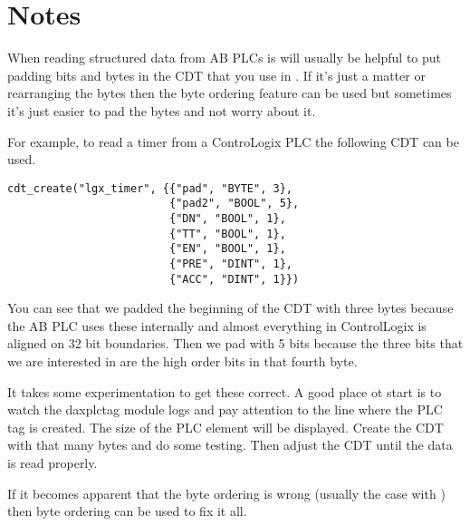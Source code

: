 \section{Notes}

When reading structured data from AB PLCs is will usually be helpful to
put padding bits and bytes in the CDT that you use in \opendax{}.  If it's
just a matter or rearranging the bytes then the byte ordering feature can
be used but sometimes it's just easier to pad the bytes and not worry about
it.

For example, to read a timer from a ControLogix PLC the following CDT can 
be used.

\begin{verbatim}
cdt_create("lgx_timer", {{"pad", "BYTE", 3},
                         {"pad2", "BOOL", 5},
                         {"DN", "BOOL", 1},
                         {"TT", "BOOL", 1},
                         {"EN", "BOOL", 1},
                         {"PRE", "DINT", 1},
                         {"ACC", "DINT", 1}})
\end{verbatim}

You can see that we padded the beginning of the CDT with three bytes because
the AB PLC uses these internally and almost everything in ControlLogix is
aligned on 32 bit boundaries.  Then we pad with 5 bits because the three
bits that we are interested in are the high order bits in that fourth byte.

It takes some experimentation to get these correct.  A good place ot start
is to watch the daxplctag module logs and pay attention to the line where
the PLC tag is created.  The size of the PLC element will be displayed.  Create
the \opendax{} CDT with that many bytes and do some testing.  Then adjust the
CDT until the data is read properly.

If it becomes apparent that the byte ordering is wrong (usually the case with
\modbus{}) then byte ordering can be used to fix it all.